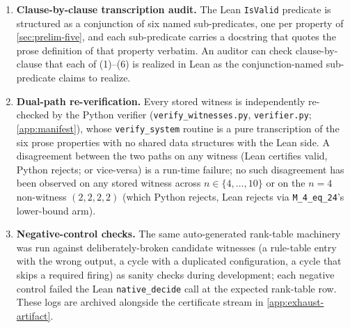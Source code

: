 \documentclass[11pt,a4paper]{article}
\theoremstyle{plain}
\theoremstyle{definition}
\begin{document}
\begin{enumerate}[leftmargin=*]
\item \textbf{Clause-by-clause transcription audit.} The Lean
\texttt{IsValid} predicate is structured as a conjunction of six
named sub-predicates, one per property of \cref{sec:prelim-five},
and each sub-predicate carries a docstring that quotes the prose
definition of that property verbatim.  An auditor can check
clause-by-clause that each of (1)--(6) is realized in Lean as the
conjunction-named sub-predicate claims to realize.
\item \textbf{Dual-path re-verification.} Every stored witness is
independently re-checked by the Python verifier
(\texttt{verify\_witnesses.py}, \texttt{verifier.py};
\cref{app:manifest}), whose \texttt{verify\_system} routine is a
pure transcription of the six prose properties with no shared data
structures with the Lean side.  A disagreement between the two
paths on any witness (Lean certifies valid, Python rejects; or
vice-versa) is a run-time failure; no such disagreement has been
observed on any stored witness across $n \in \{4, \ldots, 10\}$ or
on the $n = 4$ non-witness $(2, 2, 2, 2)$ (which Python rejects,
Lean rejects via \texttt{M\_4\_eq\_24}'s lower-bound arm).
\item \textbf{Negative-control checks.} The same auto-generated
rank-table machinery was run against deliberately-broken candidate
witnesses (a rule-table entry with the wrong output, a cycle with a
duplicated configuration, a cycle that skips a required firing) as
sanity checks during development; each negative control failed the
Lean \texttt{native\_decide} call at the expected rank-table row.
These logs are archived alongside the certificate stream in
\cref{app:exhaust-artifact}.
\end{enumerate}
\end{document}
